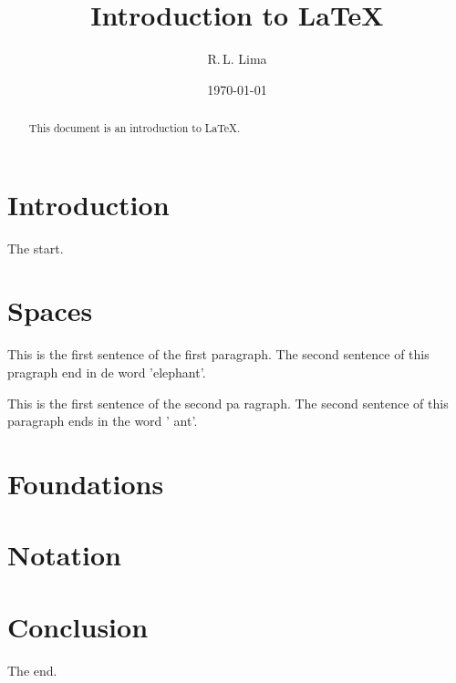 \documentclass[a4paper,11pt]{article}
\author{R.\,L. Lima}
\title{Introduction to \LaTeX}
\date{\today}
\begin{document}
	\maketitle
	\begin{abstract}
		This document is an introduction to \LaTeX.
	\end{abstract}
	\section*{Introduction}
		The start.
	\section{Spaces}
		This is the            first sentence of the first paragraph.
		The second sentence of this pragraph end in de word 'elephant'.

		This is the first sentence of the second pa%
		ragraph.
		The second sentence of this paragraph
		ends in the word '%
		ant'.
	\section{Foundations}
		\section{Notation}
			
	\section*{Conclusion}
		The end.
\end{document}
